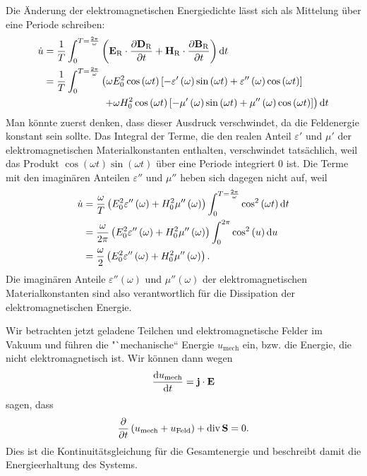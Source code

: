 Die Änderung der elektromagnetischen Energiedichte lässt sich als Mittelung über eine Periode schreiben:
\begin{align*}
	\dot{u} & =\frac{1}{T}\int _{0}^{T=\frac{2\pi }{\omega }}\left(\mathbf{E}_{\mathrm{R}}\cdot \frac{\partial \mathbf{D}_{\mathrm{R}}}{\partial t}+\mathbf{H}_{\mathrm{R}}\cdot \frac{\partial \mathbf{B}_{\mathrm{R}}}{\partial t}\right)\mathop{}\!\mathrm{d} t                  \\
	        & =\frac{1}{T}\int _{0}^{T=\frac{2\pi }{\omega }}\left(\omega E_{0}^{2}\cos \left(\omega t\right)\left[-\varepsilon '\left(\omega \right)\sin \left(\omega t\right)+\varepsilon ''\left(\omega \right)\cos \left(\omega t\right)\right] \right. \\
	        & \qquad\qquad\qquad \left. +\omega H_{0}^{2}\cos \left(\omega t\right)\left[-\mu '\left(\omega \right)\sin \left(\omega t\right)+\mu ''\left(\omega \right)\cos \left(\omega t\right)\right]\right)\mathop{}\!\mathrm{d} t
\end{align*}
Man könnte zuerst denken, dass dieser Ausdruck verschwindet, da die Feldenergie konstant sein sollte. Das Integral der Terme, die den realen Anteil $\varepsilon '$ und $\mu '$ der elektromagnetischen Materialkonstanten enthalten, verschwindet tatsächlich, weil das Produkt $\cos \left(\omega t\right)\sin \left(\omega t\right)$ über eine Periode integriert $0$ ist. Die Terme mit den imaginären Anteilen $\varepsilon ''$ und $\mu ''$ heben sich dagegen nicht auf, weil
\begin{align*}
	\dot{u} & =\frac{\omega }{T}\left(E_{0}^{2}\varepsilon ''\left(\omega \right)+H_{0}^{2}\mu ''\left(\omega \right)\right)\int _{0}^{T=\frac{2\pi }{\omega }}\cos ^{2} \left(\omega t\right)\mathop{}\!\mathrm{d} t \\
	        & =\frac{\omega }{2\pi }\left(E_{0}^{2}\varepsilon ''\left(\omega \right)+H_{0}^{2}\mu ''\left(\omega \right)\right)\int _{0}^{2\pi }\cos ^{2} \left(u\right)\mathop{}\!\mathrm{d} u                      \\
	        & =\frac{\omega }{2}\left(E_{0}^{2}\varepsilon ''\left(\omega \right)+H_{0}^{2}\mu ''\left(\omega \right)\right).
\end{align*}
Die imaginären Anteile $\varepsilon ''\left(\omega \right)$ und $\mu ''\left(\omega \right)$ der elektromagnetischen Materialkonstanten sind also verantwortlich für die Dissipation der elektromagnetischen Energie.

Wir betrachten jetzt geladene Teilchen und elektromagnetische Felder im Vakuum und führen die "`mechanische`` Energie $u_{\mathrm{mech}}$ ein, bzw. die Energie, die nicht elektromagnetisch ist. Wir können dann wegen
\begin{equation*}
	\frac{\mathop{}\!\mathrm{d} u_{\mathrm{mech}}}{\mathop{}\!\mathrm{d} t}=\mathbf{j}\cdot \mathbf{E}
\end{equation*}
sagen, dass
\begin{equation*}
	\frac{\partial }{\partial t}\left(u_{\mathrm{mech}}+u_{\text{Feld}}\right)+\operatorname{div} \mathbf{S}=0.
\end{equation*}
Dies ist die Kontinuitätsgleichung für die Gesamtenergie und beschreibt damit die Energieerhaltung des Systems.

